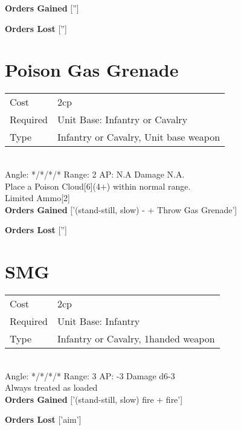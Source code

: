 {\bf Orders Gained}
['']

{\bf Orders Lost}
['']
\section{ Poison Gas Grenade }

\begin{tabular}{ll}
    Cost & 2cp \\
    Required & Unit Base: Infantry or Cavalry\\
    Type & Infantry or Cavalry, Unit base weapon\\
\end{tabular}
\ \\
\indent Angle: */*/*/* Range: 2  AP: N.A Damage N.A. \\
Place a Poison Cloud[6](4+) within normal range. \\ Limited Ammo[2]
\ \\

{\bf Orders Gained}
['(stand-still, slow) - + Throw Gas Grenade']

{\bf Orders Lost}
['']
\section{ SMG }

\begin{tabular}{ll}
    Cost & 2cp \\
    Required & Unit Base: Infantry\\
    Type & Infantry or Cavalry, 1handed weapon\\
\end{tabular}
\ \\
\indent Angle: */*/*/* Range: 3  AP: -3 Damage d6-3 \\
Always treated as loaded
\ \\

{\bf Orders Gained}
['(stand-still, slow) fire + fire']

{\bf Orders Lost}
['aim']
